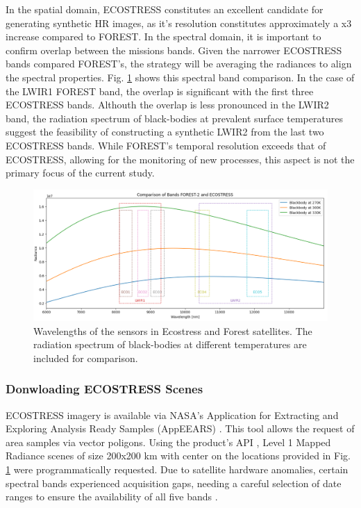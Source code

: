         In the spatial domain, ECOSTRESS constitutes an excellent candidate for generating synthetic HR images, as it's resolution constitutes approximately a x3 increase compared to FOREST. In the spectral domain, it is important to confirm overlap between the missions bands. Given the narrower ECOSTRESS bands compared FOREST's, the strategy will be averaging the radiances to align the spectral properties. Fig. \ref{fig:5-wavelength-comparison} shows this spectral band comparison. In the case of the LWIR1 FOREST band, the overlap is significant with the first three ECOSTRESS bands. Althouth the overlap is less pronounced in the LWIR2 band, the radiation spectrum of black-bodies at prevalent surface temperatures suggest the feasibility of constructing a synthetic LWIR2 from the last two ECOSTRESS bands. While FOREST's temporal resolution exceeds that of ECOSTRESS, allowing for the monitoring of new processes, this aspect is not the primary focus of the current study.
    

        \begin{figure}[h!]
            \centering
            \includegraphics[width=\linewidth]{Includes/5-wavelength-comparison.png}
            \caption{Wavelengths of the sensors in Ecostress and Forest satellites. The radiation spectrum of black-bodies at different temperatures are included for comparison.}
            \label{fig:5-wavelength-comparison}
        \end{figure}

        \subsubsection{Donwloading ECOSTRESS Scenes}
            ECOSTRESS imagery is available via NASA's Application for Extracting and Exploring Analysis Ready Samples (AppEEARS) \cite{AppEEARS2023}. This tool allows the request of area samples via vector poligons. Using the product's API \cite{AppEEARSAPI2023}, Level 1 Mapped Radiance scenes of size 200x200 km  with center on the locations provided in Fig. \ref{fig:5-wavelength-comparison} were programmatically requested. Due to satellite hardware anomalies, certain spectral bands experienced acquisition gaps, needing a careful selection of date ranges to ensure the availability of all five bands \cite{ECO1BMAPRAD2023}.
    
